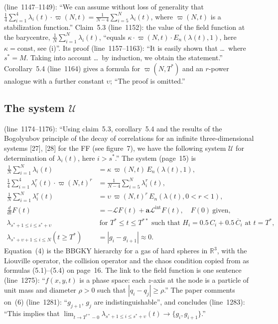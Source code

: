 \documentclass[11pt,a4paper]{article}
\newcommand{\Cbar}{\overline{C}}
\newcommand{\paperline}[1]{(line~#1)}
\begin{document}
\paperline{1147--1149}: ``We can assume without loss of generality that $\frac14\sum_{i=1}^4\lambda_i(t)\cdot\varpi(N,t)=\frac1{N-4}\sum_{i=5}^N\lambda_i(t)$, where $\varpi(N,t)$ is a stabilization function.'' Claim~5.3 \paperline{1152}: the value of the field function at the barycentre, $\frac1N\sum_{i=1}^N\lambda_i(t)$, ``equals $\kappa\cdot\varpi(N,t)\cdot E_n(\lambda(t),1)$, here $\kappa=\mathrm{const}$, see (i)''. Its proof \paperline{1157--1163}: ``It is easily shown that \ldots\ where $s^*=M$. Taking into account \ldots\ by induction, we obtain the statement.'' Corollary~5.4 \paperline{1164} gives a formula for $\varpi(N,T^*)$ and an $r$-power analogue with a further constant $\upsilon$; ``The proof is omitted.''

\subsection{The system $\mathcal U$}

\paperline{1174--1176}: ``Using claim~5.3, corollary~5.4 and the results of the Bogolyubov principle of the decay of correlations for an infinite three-dimensional systems [27], [28] for the FF (see figure~7), we have the following system $\mathcal U$ for determination of $\lambda_i(t)$, here $i>s^*$.'' The system (page~15) is
\begin{align}
\tfrac1N\textstyle\sum_{i=1}^N\lambda_i(t) &= \kappa\,\varpi(N,t)\,E_n(\lambda(t),1), \tag{1}\\
\tfrac14\textstyle\sum_{i=1}^4\lambda_i^r(t)\cdot\varpi(N,t)^r &= \tfrac1{N-4}\textstyle\sum_{i=5}^N\lambda_i^r(t), \tag{2}\\
\tfrac1N\textstyle\sum_{i=1}^N\lambda_i^r(t) &= \upsilon\,\varpi(N,t)^r\,E_n(\lambda(t),0<r<1), \tag{3}\\
\tfrac{d}{dt}F(t) &= -\mathcal L F(t)+\mathbf a\mathcal L^{\mathrm{int}}F(t),\quad F(0)\ \text{given}, \tag{4}\\
\lambda_{s^*+1\le i\le s^*+\upsilon} &\ \text{for } T^*\le t\le T^{**} \text{ such that } H_i=0.5\,C_i+0.5\,\Cbar_i \text{ at } t=T^*, \tag{5}\\
\lambda_{s^*+\upsilon+1\le i\le N}(t\ge T^*) &= |g_i-g_{i+1}|\approx 0. \tag{6}
\end{align}
Equation~(4) is the BBGKY hierarchy for a gas of hard spheres in $\mathbb R^3$, with the Liouville operator, the collision operator and the chaos condition copied from \cite{gerasimenko} as formulas (5.1)--(5.4) on page~16. The link to the field function is one sentence \paperline{1275}: ``$f(x,y,t)$ is a phase space: each $z$-axis at the node is a particle of unit mass and diameter $\rho>0$ such that $|q_i-q_j|\ge\rho$.'' The paper comments on~(6) \paperline{1281}: ``$g_{j+1}$, $g_j$ are indistinguishable'', and concludes \paperline{1283}: ``This implies that $\lim_{t\to T^{**}-0}\lambda_{s^*+1\le i\le s^*+\upsilon}(t)\to\{g_i,g_{i+1}\}$.''
\end{document}
